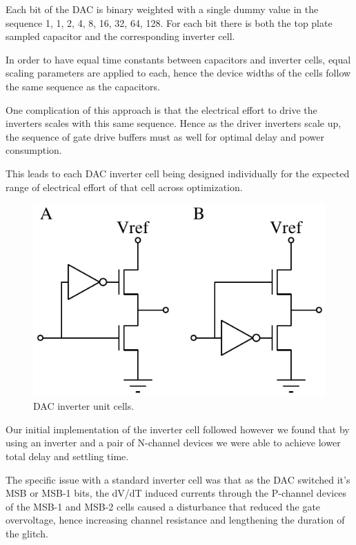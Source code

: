 \documentclass[10pt,journal]{IEEEtran}\usepackage{longtable}
\begin{document}
Each bit of the DAC is binary weighted with a single dummy value in the
sequence 1, 1, 2, 4, 8, 16, 32, 64, 128.
For each bit there is both the top plate sampled capacitor and the corresponding inverter cell.

In order to have equal time constants between capacitors and inverter cells, equal scaling parameters are applied to each, hence the device widths of the cells follow the same sequence as the capacitors.

One complication of this approach is that the electrical effort to drive the inverters scales with this same sequence. 
Hence as the driver inverters scale up, the sequence of gate drive buffers must as well for optimal delay and power consumption.

This leads to each DAC inverter cell being designed individually for the expected range of electrical effort of that cell across optimization.

\begin{figure}[tbph]
\begin{center}
\includegraphics[width=0.7\columnwidth]{DAC_Switch.pdf}
\caption{DAC inverter unit cells.}
\label{fig:DACUnitInverterSch}
\end{center}
\end{figure}


Our initial implementation of the inverter cell followed \cite{Tripathi:2013} however we found that by using an inverter and a pair of N-channel devices we were able to achieve lower total delay and settling time. 

The specific issue with a standard inverter cell was that as the DAC switched it's MSB or MSB-1 bits, the dV/dT induced currents through the P-channel devices of the MSB-1 and MSB-2 cells caused a disturbance that reduced the gate overvoltage, hence increasing channel resistance and lengthening the duration of the glitch. 
\end{document}
